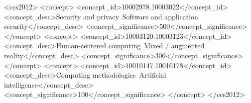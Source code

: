 \documentclass[sigconf,review,anonymous]{acmart}
\begin{document}
\begin{CCSXML}
<ccs2012>
   <concept>
       <concept_id>10002978.10003022</concept_id>
       <concept_desc>Security and privacy~Software and application security</concept_desc>
       <concept_significance>500</concept_significance>
   </concept>
   <concept>
       <concept_id>10003120.10003123</concept_id>
       <concept_desc>Human-centered computing~Mixed / augmented reality</concept_desc>
       <concept_significance>300</concept_significance>
   </concept>
   <concept>
       <concept_id>10010147.10010178</concept_id>
       <concept_desc>Computing methodologies~Artificial intelligence</concept_desc>
       <concept_significance>100</concept_significance>
   </concept>
</ccs2012>
\end{CCSXML}




\maketitle
\end{document}

